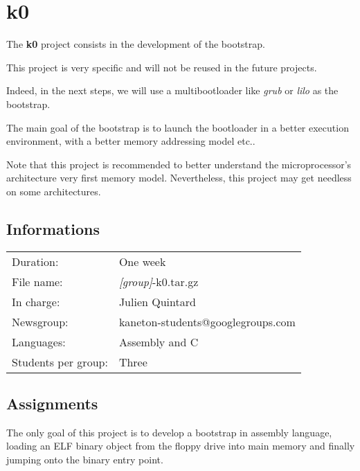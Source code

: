 
%
%

\chapter{k0}

The \textbf{k0} project consists in the development of the bootstrap.

This project is very specific and will not be reused in the future
projects.

Indeed, in the next steps, we will use a multibootloader like \textit{grub}
or \textit{lilo} as the bootstrap.

The main goal of the bootstrap is to launch the bootloader in a better
execution environment, with a better memory addressing model etc..

Note that this project is recommended to better understand the
microprocessor's architecture very first memory model. Nevertheless,
this project may get needless on some architectures.

\newpage

%
%

\section{Informations}

\begin{tabular}{p{7cm}l}
Duration: & One week \\
File name: & \textit{[group]}-k0.tar.gz \\
In charge: & Julien Quintard \\
Newsgroup: & kaneton-students@googlegroups.com \\
Languages: & Assembly and C \\
Students per group: & Three \\
\end{tabular}

%
%

\section{Assignments}

The only  goal of this project is to develop a bootstrap in assembly language,
loading an ELF binary object from the floppy drive into main memory and
finally jumping onto the binary entry point.


